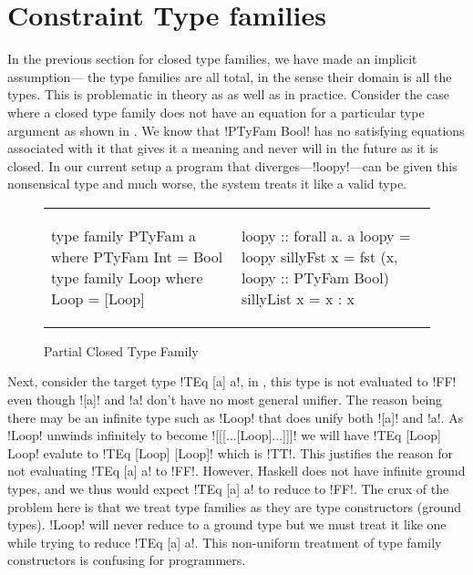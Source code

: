 \documentclass[format=acmsmall,manuscript,review,screen,nonacm,margin=1in,11pt]{acmart}
\begin{document}
\section{Constraint Type families}\label{sec:tf-constrained}
In the previous section for closed type families, we have made an implicit assumption---
the type families are all total, in the sense their domain is all the types.
This is problematic in theory as as well as in practice.
Consider the case where a closed type family does not have an equation for a particular type argument
as shown in . We know that !PTyFam Bool!
has no satisfying equations associated with it that gives it a meaning and never will in the future
as it is closed. In our current setup a program that diverges---!loopy!---can be given
this nonsensical type and much worse, the system treats it like a valid type.
\begin{figure}[ht]
    \footnotesize
  \begin{tabular}{l l}
\begin{code}
type family PTyFam a where
  PTyFam Int = Bool
type family Loop where
  Loop = [Loop]
\end{code}&%
\begin{code}
loopy :: forall a. a
loopy = loopy
sillyFst x = fst (x, loopy :: PTyFam Bool)
sillyList x = x : x
\end{code}
  \end{tabular}
  \caption{Partial Closed Type Family}
  \label{fig:incomplete-tyfam}
\end{figure}

Next, consider the target type !TEq [a] a!, in \CLTF, this type is not evaluated to
!FF! even though ![a]! and !a! don't have no most general unifier. The reason being there
may be an infinite type such as !Loop! that does unify both ![a]! and !a!. As
!Loop! unwinds infinitely to become ![[[$\ldots$[Loop]$\ldots$]]]! we will have
!TEq [Loop] Loop! evalute to !TEq [Loop] [Loop]! which is !TT!. This justifies the
reason for not evaluating !TEq [a] a! to !FF!. However, Haskell does not have infinite ground types,
and we thus would expect !TEq [a] a! to reduce to !FF!.
The crux of the problem here is that we treat type families as they are type constructors (ground types).
!Loop! will never reduce to a ground type but we must treat it like one while trying to reduce !TEq [a] a!.
This non-uniform treatment of type family constructors is confusing for programmers.
\end{document}
